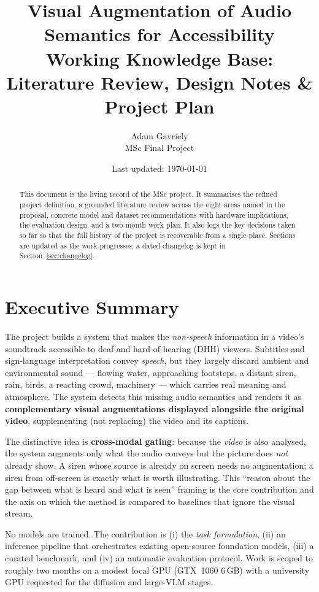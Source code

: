 \documentclass[11pt,a4paper]{article}
\title{\textbf{Visual Augmentation of Audio Semantics for Accessibility}\\[4pt]
\large Working Knowledge Base: Literature Review, Design Notes \& Project Plan}
\author{Adam Gavriely \\ \small MSc Final Project}
\date{Last updated: \today}
\begin{document}
\maketitle

\begin{abstract}
\noindent This document is the living record of the MSc project. It summarises the refined
project definition, a grounded literature review across the eight areas named in the proposal,
concrete model and dataset recommendations with hardware implications, the evaluation design,
and a two-month work plan. It also logs the key decisions taken so far so that the full history
of the project is recoverable from a single place. Sections are updated as the work progresses;
a dated changelog is kept in Section~\ref{sec:changelog}.
\end{abstract}

\tableofcontents

\section{Executive Summary}
The project builds a system that makes the \emph{non-speech} information in a video's soundtrack
accessible to deaf and hard-of-hearing (DHH) viewers. Subtitles and sign-language interpretation
convey \emph{speech}, but they largely discard ambient and environmental sound --- flowing water,
approaching footsteps, a distant siren, rain, birds, a reacting crowd, machinery --- which carries
real meaning and atmosphere. The system detects this missing audio semantics and renders it as
\textbf{complementary visual augmentations displayed alongside the original video}, supplementing
(not replacing) the video and its captions.

The distinctive idea is \textbf{cross-modal gating}: because the \emph{video} is also analysed,
the system augments only what the audio conveys but the picture does \emph{not} already show.
A siren whose source is already on screen needs no augmentation; a siren from off-screen is
exactly what is worth illustrating. This ``reason about the gap between what is heard and what is
seen'' framing is the core contribution and the axis on which the method is compared to baselines
that ignore the visual stream.

No models are trained. The contribution is (i) the \emph{task formulation}, (ii) an inference
pipeline that orchestrates existing open-source foundation models, (iii) a curated benchmark, and
(iv) an automatic evaluation protocol. Work is scoped to roughly two months on a modest local GPU
(GTX~1060 6\,GB) with a university GPU requested for the diffusion and large-VLM stages.
\end{document}
